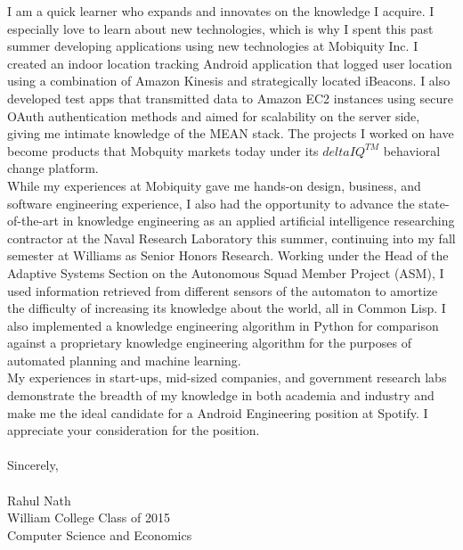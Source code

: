 \documentclass[11pt]{letter} %
\newcommand{\forceindent}{\leavevmode{\parindent=24pt\indent}}
\begin{document}
\forceindent I am a quick learner who expands and innovates on the knowledge I acquire. I especially love to learn about new technologies, which is why I spent this past summer developing applications using new technologies at Mobiquity Inc. I created an indoor location tracking Android application that logged user location using a combination of Amazon Kinesis and strategically located iBeacons. I also developed test apps that transmitted data to Amazon EC2 instances using secure OAuth authentication methods and aimed for scalability on the server side, giving me intimate knowledge of the MEAN stack. The projects I worked on have become products that Mobquity markets today under its $deltaIQ^{TM}$ behavioral change platform. \\ %

\forceindent While my experiences at Mobiquity gave me hands-on design, business, and software engineering experience, I also had the opportunity to advance the state-of-the-art in knowledge engineering as an applied artificial intelligence researching contractor at the Naval Research Laboratory this summer, continuing into my fall semester at Williams as Senior Honors Research. Working under the Head of the Adaptive Systems Section on the Autonomous Squad Member Project (ASM), I used information retrieved from different sensors of the automaton to amortize the difficulty of increasing its knowledge about the world, all in Common Lisp. I also implemented a knowledge engineering algorithm in Python for comparison against a proprietary knowledge engineering algorithm for the purposes of automated planning and machine learning. \\

\forceindent My experiences in start-ups, mid-sized companies, and government research labs demonstrate the breadth of my knowledge in both academia and industry and make me the ideal candidate for a Android Engineering position at Spotify. I appreciate your consideration for the position. \\ \\

Sincerely, \\ \\
Rahul Nath \\
William College Class of 2015  \\
Computer Science and Economics



\end{document}
